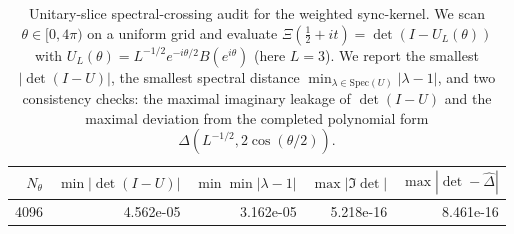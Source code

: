 \begin{table}[H]
\centering
\scriptsize
\setlength{\tabcolsep}{6pt}
\caption{Unitary-slice spectral-crossing audit for the weighted sync-kernel. We scan $\theta\in[0,4\pi)$ on a uniform grid and evaluate $\Xi(\tfrac12+it)=\det(I-U_L(\theta))$ with $U_L(\theta)=L^{-1/2}e^{-i\theta/2}B(e^{i\theta})$ (here $L=3$). We report the smallest $|\det(I-U)|$, the smallest spectral distance $\min_{\lambda\in\mathrm{Spec}(U)}|\lambda-1|$, and two consistency checks: the maximal imaginary leakage of $\det(I-U)$ and the maximal deviation from the completed polynomial form $\widehat\Delta(L^{-1/2},2\cos(\theta/2))$.}
\label{tab:sync_kernel_unitary_slice_spectral_crossing}
\begin{tabular}{r r r r r}
\toprule
$N_\theta$ & $\min|\det(I-U)|$ & $\min\min|\lambda-1|$ & $\max|\Im\det|$ & $\max|\det-\widehat\Delta|$\\
\midrule
4096 & 4.562e-05 & 3.162e-05 & 5.218e-16 & 8.461e-16\\
\bottomrule
\end{tabular}
\end{table}
